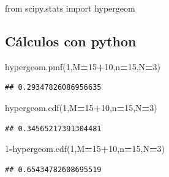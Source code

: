 \documentclass[]{book}
\newenvironment{Shaded}{\begin{snugshade}}{\end{snugshade}}
\newcommand{\DecValTok}[1]{\textcolor[rgb]{0.00,0.00,0.81}{#1}}
\newcommand{\ImportTok}[1]{#1}
\newcommand{\NormalTok}[1]{#1}
\newcommand{\OperatorTok}[1]{\textcolor[rgb]{0.81,0.36,0.00}{\textbf{#1}}}
\begin{document}
\begin{Shaded}
\begin{Highlighting}[]
\ImportTok{from}\NormalTok{ scipy.stats }\ImportTok{import}\NormalTok{ hypergeom}
\end{Highlighting}
\end{Shaded}

\hypertarget{cuxe1lculos-con-python-12}{%
\subsection{Cálculos con python}\label{cuxe1lculos-con-python-12}}

\begin{Shaded}
\begin{Highlighting}[]
\NormalTok{hypergeom.pmf(}\DecValTok{1}\NormalTok{,M}\OperatorTok{=}\DecValTok{15}\OperatorTok{+}\DecValTok{10}\NormalTok{,n}\OperatorTok{=}\DecValTok{15}\NormalTok{,N}\OperatorTok{=}\DecValTok{3}\NormalTok{)}
\end{Highlighting}
\end{Shaded}

\begin{verbatim}
## 0.29347826086956635
\end{verbatim}

\begin{Shaded}
\begin{Highlighting}[]
\NormalTok{hypergeom.cdf(}\DecValTok{1}\NormalTok{,M}\OperatorTok{=}\DecValTok{15}\OperatorTok{+}\DecValTok{10}\NormalTok{,n}\OperatorTok{=}\DecValTok{15}\NormalTok{,N}\OperatorTok{=}\DecValTok{3}\NormalTok{)}
\end{Highlighting}
\end{Shaded}

\begin{verbatim}
## 0.34565217391304481
\end{verbatim}

\begin{Shaded}
\begin{Highlighting}[]
\DecValTok{1}\OperatorTok{-}\NormalTok{hypergeom.cdf(}\DecValTok{1}\NormalTok{,M}\OperatorTok{=}\DecValTok{15}\OperatorTok{+}\DecValTok{10}\NormalTok{,n}\OperatorTok{=}\DecValTok{15}\NormalTok{,N}\OperatorTok{=}\DecValTok{3}\NormalTok{)}
\end{Highlighting}
\end{Shaded}

\begin{verbatim}
## 0.65434782608695519
\end{verbatim}
\end{document}
